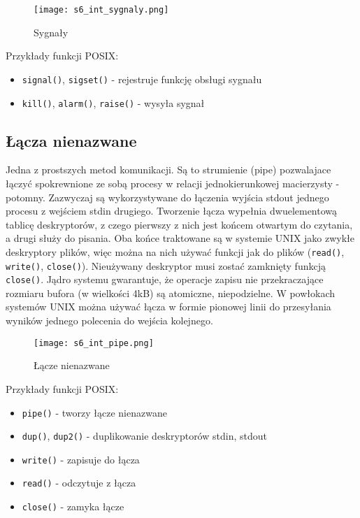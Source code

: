 \begin{figure}[!h]
\centering
\texttt{[image: s6\_int\_sygnaly.png]}
\caption{Sygnały}
\end{figure}

Przykłady funkcji POSIX:
\begin{itemize}
	\item \texttt{signal()}, \texttt{sigset()} - rejestruje funkcję obsługi sygnału
    \item \texttt{kill()}, \texttt{alarm()}, \texttt{raise()} - wysyła sygnał
\end{itemize}

\subsection{Łącza nienazwane}

Jedna z prostszych metod komunikacji. Są to strumienie (pipe) pozwalajace łączyć spokrewnione ze sobą procesy w relacji jednokierunkowej macierzysty - potomny. Zazwyczaj są wykorzystywane do łączenia wyjścia stdout jednego procesu z wejściem stdin drugiego. Tworzenie łącza wypełnia dwuelementową tablicę deskryptorów, z czego pierwszy z nich jest końcem otwartym do czytania, a drugi służy do pisania. Oba końce traktowane są w systemie UNIX jako zwykłe deskryptory plików, więc można na nich używać funkcji jak do plików (\texttt{read()}, \texttt{write()}, \texttt{close()}). Nieużywany deskryptor musi zostać zamknięty funkcją \texttt{close()}. Jądro systemu gwarantuje, że operacje zapisu nie przekraczające rozmiaru bufora (w wielkości 4kB) są atomiczne, niepodzielne. W powłokach systemów UNIX można używać łącza w formie pionowej linii do przesyłania wyników jednego polecenia do wejścia kolejnego.

\newpage

\begin{figure}[!h]
\centering
\texttt{[image: s6\_int\_pipe.png]}
\caption{Łącze nienazwane}
\end{figure}

Przykłady funkcji POSIX:
\begin{itemize}
	\item \texttt{pipe()} - tworzy łącze nienazwane
    \item \texttt{dup()}, \texttt{dup2()} - duplikowanie deskryptorów stdin, stdout
    \item \texttt{write()} - zapisuje do łącza
    \item \texttt{read()} - odczytuje z łącza
    \item \texttt{close()} - zamyka łącze
\end{itemize}

